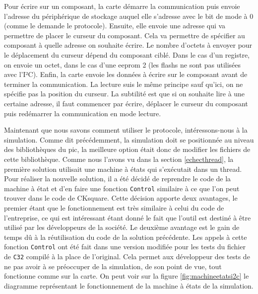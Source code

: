 \documentclass[a4paper]{article}
\begin{document}
Pour écrire sur un composant, la carte démarre la communication puis envoie
l'adresse du périphérique de stockage auquel elle s'adresse avec le bit de mode à
0 (comme le demande le protocole). Ensuite, elle envoie une adresse qui va
permettre de placer le curseur du composant. Cela va permettre de spécifier au
composant à quelle adresse on souhaite écrire. Le nombre d'octets à envoyer pour
le déplacement du curseur dépend du composant ciblé. Dans le cas d'un registre,
on envoie un octet, dans le cas d'une eeprom 2 (les flashs ne sont pas utilisées
avec l'I²C). Enfin, la carte envoie les données à écrire sur le composant avant
de terminer la communication. La lecture suis le même principe sauf qu'ici, on
ne spécifie pas la position du curseur. La subtilité est que si on souhaite lire
à une certaine adresse, il faut commencer par écrire, déplacer le curseur du
composant puis redémarrer la communication en mode lecture.

Maintenant que nous savons comment utiliser le protocole, intéressons-nous à la
simulation. Comme dit précédemment, la simulation doit se positionnée au niveau
des bibliothèques du \gls{pic}, la meilleure option était donc de modifier les
fichiers de cette bibliothèque. Comme nous l'avons vu dans la section
\ref{echecthread}, la première solution utilisait une machine à états qui
s'exécutait dans un thread. Pour réaliser la nouvelle solution, il a été décidé
de reprendre le code de la machine à état et d'en faire une fonction
\verb|Control| similaire à ce que l'on peut trouver dans le code de
CKsquare. Cette décision apporte deux avantages, le premier étant que le
fonctionnement est très similaire à celui du code de l'entreprise, ce qui est
intéressant étant donné le fait que l'outil est destiné à être utilisé par les
développeurs de la société. Le deuxième avantage est le gain de temps dû à la
réutilisation du code de la solution précédente. Les appels à cette fonction
\verb|Control| ont été fait dans une version modifiée pour les tests du
fichier de \verb|C32| compilé à la place de l'original. Cela permet aux développeur
 des tests de ne pas avoir à se préoccuper de la simulation, de son
point de vue, tout fonctionne comme sur la carte. On peut voir sur la figure
\ref{fig:machineetatsi2c} le diagramme représentant le fonctionnement de la
machine à états de la simulation.
\end{document}
